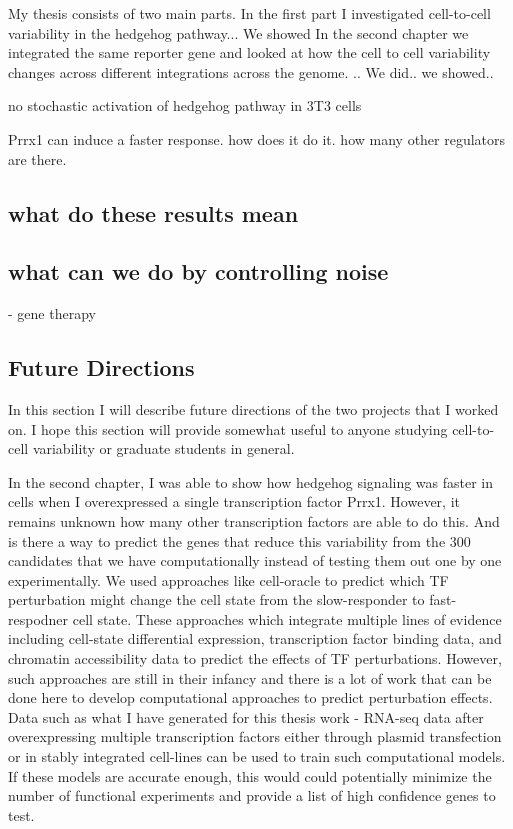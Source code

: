 My thesis consists of two main parts. 
In the first part I investigated cell-to-cell variability in the hedgehog pathway... We showed
In the second chapter we integrated the same reporter gene and looked at how the cell to cell variability changes across 
different integrations across the genome. .. We did.. we showed.. 

no stochastic activation of hedgehog pathway in 3T3 cells

Prrx1 can induce a faster response. how does it do it. how many other regulators are there.

\subsection{what do these results mean}


\subsection{what can we do by controlling noise}
- gene therapy

\subsection{Future Directions}
In this section I will describe future directions of the two projects that I worked on. I hope this section will provide somewhat useful to anyone studying cell-to-cell variability or graduate students in general.

In the second chapter, I was able to show how hedgehog signaling was faster in cells when I overexpressed a single transcription factor Prrx1. However, it remains unknown how many other transcription factors are able to do this. And is there a way to predict the genes that reduce this variability from the 300 candidates that we have computationally instead of testing them out one by one experimentally. We used approaches like cell-oracle \cite{cell-oracle} to predict which TF perturbation might change the cell state from the slow-responder to fast-respodner cell state. These approaches which integrate multiple lines of evidence including cell-state differential expression, transcription factor binding data, and chromatin accessibility data to predict the effects of TF perturbations. However, such approaches are still in their infancy and there is a lot of work that can be done here to develop computational approaches to predict perturbation effects. Data such as what I have generated for this thesis work - RNA-seq data after overexpressing multiple transcription factors either through plasmid transfection or in stably integrated cell-lines can be used to train such computational models. If these models are accurate enough, this would could potentially minimize the number of functional experiments and provide a list of high confidence genes to test.

